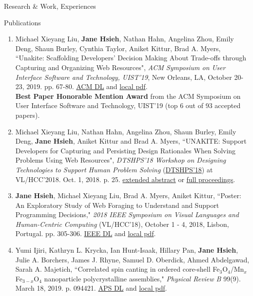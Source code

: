 \documentclass{resume}
\begin{document}
\begin{rSection}{Research \& Work, Experiences}
\end{rSection}

\begin{rSection}{Publications}
\begin{enumerate}
    \item Michael Xieyang Liu, \textbf{Jane Hsieh}, Nathan Hahn, Angelina Zhou, Emily Deng, Shaun Burley, Cynthia Taylor, Aniket Kittur, Brad A. Myers, ``Unakite: Scaffolding Developers’ Decision Making About Trade-offs through Capturing and Organizing Web Resources", \textit{ACM Symposium on User Interface Software and Technology, UIST'19}, New Orleans, LA, October 20-23, 2019. pp. 67-80. \href{https://dl.acm.org/citation.cfm?id=3347908}{ACM DL} and \href{http://www.cs.cmu.edu/~NatProg/papers/p67-liu-Unakite-UIST.pdf}{local pdf}.\\
    \textbf{Best Paper Honorable Mention Award} from the ACM Symposium on User Interface Software and Technology, UIST'19 (top 6 out of 93 accepted papers). 
    \item Michael Xieyang Liu, Nathan Hahn, Angelina Zhou, Shaun Burley, Emily Deng, \textbf{Jane Hsieh}, Aniket Kittur and Brad A. Myers, ``UNAKITE: Support Developers for Capturing and Persisting Design Rationales When Solving Problems Using Web Resources", \textit{DTSHPS'18 Workshop on Designing Technologies to Support Human Problem Solving} (\href{https://www.cs.washington.edu/dtshps2018/index.html}{DTSHPS'18}) at VL/HCC'2018. Oct. 1, 2018. p. 25. \href{http://www.cs.cmu.edu/~NatProg/papers/DTSHPS%20paper%207%20-%20one-page-summary-with-references%20v2.pdf}{extended abstract} or \href{https://digital.lib.washington.edu/researchworks/bitstream/handle/1773/42857/DTSHPS18-Proceedings-final%20v2.pdf}{full proceedings}.
    \item \textbf{Jane Hsieh}, Michael Xieyang Liu, Brad A. Myers, Aniket Kittur, ``Poster: An Exploratory Study of Web Foraging to Understand and Support Programming Decisions," \textit{2018 IEEE Symposium on Visual Languages and Human-Centric Computing} (VL/HCC'18), October 1 - 4, 2018, Lisbon, Portugal. pp. 305-306. \href{https://ieeexplore.ieee.org/document/8506517}{IEEE DL} and \href{http://www.cs.cmu.edu/~NatProg/papers/p305-hsieh.pdf}{local pdf}.
    \item Yumi Ijiri, Kathryn L. Krycka, Ian Hunt-Isaak, Hillary Pan, \textbf{Jane Hsieh}, Julie A. Borchers, James J. Rhyne, Samuel D. Oberdick, Ahmed Abdelgawad, Sarah A. Majetich, ``Correlated spin canting in ordered core-shell Fe$_3$O$_4$/Mn$_x$Fe$_{3-x}$O$_4$ nanoparticle polycrystalline assemblies," \textit{Physical Review B} 99(9). March 18, 2019. p. 094421. \href{https://journals.aps.org/prb/abstract/10.1103/PhysRevB.99.094421}{APS DL} and \href{https://janeon.github.io/assets/img/PhysRevB.99.094421.pdf}{local pdf}.


\end{enumerate}
\end{rSection}
\end{document}
